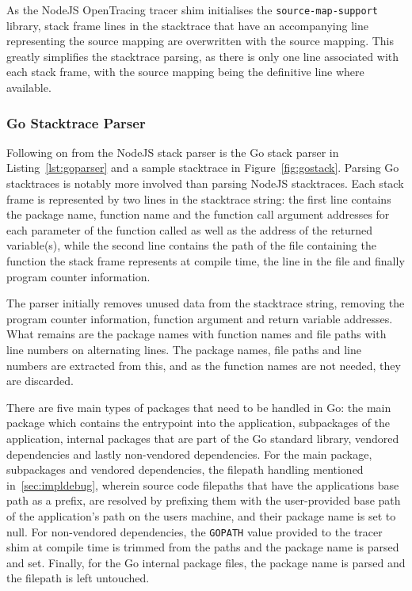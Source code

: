 \documentclass[12pt,pdftex,titlepage]{report}
\begin{document}
                    As the NodeJS OpenTracing tracer shim initialises the \texttt{source-map-support}\cite{sourcemapsupport} library, stack frame lines in the stacktrace that have an 
                    accompanying line representing the source mapping are overwritten with the source mapping. This greatly simplifies the stacktrace parsing, as there is only one line
                    associated with each stack frame, with the source mapping being the definitive line where available.

                \subsubsection{Go Stacktrace Parser}
                    Following on from the NodeJS stack parser is the Go stack parser in Listing~\ref{lst:goparser} and a sample stacktrace in Figure~\ref{fig:gostack}. Parsing Go
                    stacktraces is notably more involved than parsing NodeJS stacktraces. Each stack frame is represented by two lines in the stacktrace string: the first line contains
                    the package name, function name and the function call argument addresses for each parameter of the function called as well as the address of the returned variable(s),
                    while the second line contains the path of the file containing the function the stack frame represents at compile time, the line in the file and finally program counter
                    information. 

                    The parser initially removes unused data from the stacktrace string, removing the program counter information, function argument and return variable addresses. What remains
                    are the package names with function names and file paths with line numbers on alternating lines. The package names, file paths and line numbers are extracted from this, and
                    as the function names are not needed, they are discarded. 

                    There are five main types of packages that need to be handled in Go: the main package which contains the entrypoint into the application, subpackages of the application,
                    internal packages that are part of the Go standard library, vendored dependencies and lastly non-vendored dependencies. For the main package, subpackages and vendored
                    dependencies, the filepath handling mentioned in~\ref{sec:impldebug}, wherein source code filepaths that have the applications base path as a prefix, are resolved by prefixing
                    them with the user-provided base path of the application's path on the users machine, and their package name is set to null. For non-vendored dependencies, the \texttt{GOPATH} 
                    value provided to the tracer shim at compile time is trimmed from the paths and the package name is parsed and set. Finally, for the Go internal package files, the package name
                    is parsed and the filepath is left untouched.
\end{document}

